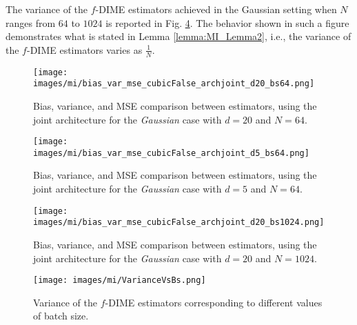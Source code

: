 The variance of the $f$-DIME estimators achieved in the Gaussian setting when $N$ ranges from $64$ to $1024$ is reported in Fig. \ref{fig:MI_VarianceVsBs}. The behavior shown in such a figure demonstrates what is stated in Lemma \ref{lemma:MI_Lemma2}, i.e., the variance of the $f$-DIME estimators varies as $\frac{1}{N}$. 

\begin{figure}
	\centering
	\texttt{[image: images/mi/bias\_var\_mse\_cubicFalse\_archjoint\_d20\_bs64.png]}
	\caption{Bias, variance, and MSE comparison between estimators, using the joint architecture for the \textit{Gaussian} case with $d=20$ and $N=64$.}
	\label{fig:MI_bias_var_mse_gaussian_d20_N64}
\end{figure} 
\begin{figure}
	\centering
	\texttt{[image: images/mi/bias\_var\_mse\_cubicFalse\_archjoint\_d5\_bs64.png]}
	\caption{Bias, variance, and MSE comparison between estimators, using the joint architecture for the \textit{Gaussian} case with $d=5$ and $N=64$.}
	\label{fig:MI_bias_var_mse_gaussian_d5_N64}
\end{figure} 
\begin{figure}
	\centering
	\texttt{[image: images/mi/bias\_var\_mse\_cubicFalse\_archjoint\_d20\_bs1024.png]}
	\caption{Bias, variance, and MSE comparison between estimators, using the joint architecture for the \textit{Gaussian} case with $d=20$ and $N=1024$.}
	\label{fig:MI_bias_var_mse_gaussian_d20_N1024}
\end{figure} 

\begin{figure}
	\centering
	\texttt{[image: images/mi/VarianceVsBs.png]}
	\caption{Variance of the $f$-DIME estimators corresponding to different values of batch size.}
	\label{fig:MI_VarianceVsBs}
\end{figure} 

